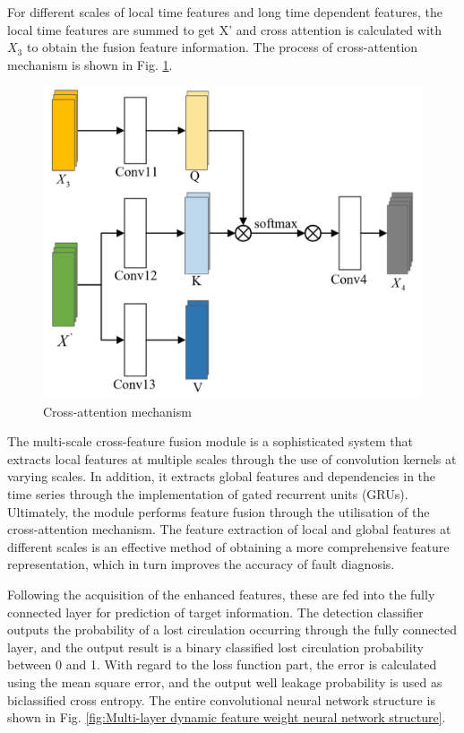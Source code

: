 \documentclass[journal,article,submit,pdftex,moreauthors]{Definitions/mdpi}
\begin{document}
For different scales of local time features and long time dependent features, the local time features are summed to get X' and cross attention is calculated with \({{X}_{3}}\) to obtain the fusion feature information. The process of cross-attention mechanism is shown in Fig. \ref{fig:Cross-attention mechanism}.

\begin{figure}[h]
    \centering
    \includegraphics[width=0.75\linewidth]{图片/交叉注意力机制.png}
    \caption{Cross-attention mechanism}
    \label{fig:Cross-attention mechanism}
\end{figure}
The multi-scale cross-feature fusion module is a sophisticated system that extracts local features at multiple scales through the use of convolution kernels at varying scales. In addition, it extracts global features and dependencies in the time series through the implementation of gated recurrent units (GRUs). Ultimately, the module performs feature fusion through the utilisation of the cross-attention mechanism. The feature extraction of local and global features at different scales is an effective method of obtaining a more comprehensive feature representation, which in turn improves the accuracy of fault diagnosis.

Following the acquisition of the enhanced features, these are fed into the fully connected layer for prediction of target information. The detection classifier outputs the probability of a lost circulation occurring through the fully connected layer, and the output result is a binary classified lost circulation probability between 0 and 1. With regard to the loss function part, the error is calculated using the mean square error, and the output well leakage probability is used as biclassified cross entropy. The entire convolutional neural network structure is shown in Fig. \ref{fig:Multi-layer dynamic feature weight neural network structure}.
\end{document}
